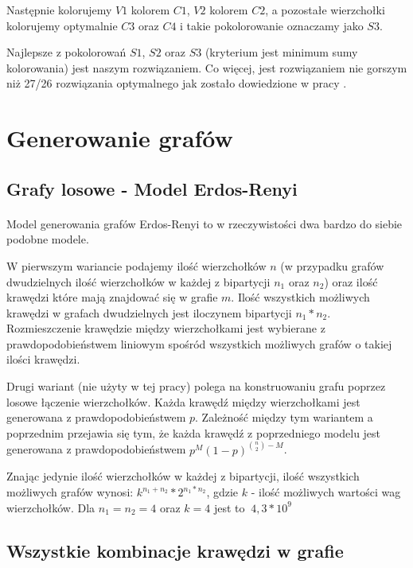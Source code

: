 \documentclass{article}
\begin{document}
Następnie kolorujemy $V1$ kolorem $C1$, $V2$ kolorem $C2$, a pozostałe wierzchołki kolorujemy optymalnie $C3$ oraz $C4$ i takie pokolorowanie oznaczamy jako $S3$.

Najlepsze z pokolorowań $S1$, $S2$ oraz $S3$ (kryterium jest minimum sumy kolorowania) jest naszym rozwiązaniem. Co więcej, jest rozwiązaniem nie gorszym niż 27/26 rozwiązania optymalnego jak zostało dowiedzione w pracy \cite{kubale-pikies19}.

\section{Generowanie grafów}

\subsection{Grafy losowe - Model Erdos-Renyi}

\paragraph{} Model generowania grafów Erdos-Renyi to w rzeczywistości dwa bardzo do siebie podobne modele. 

W pierwszym wariancie podajemy ilość wierzchołków $n$ (w przypadku grafów dwudzielnych ilość wierzchołków w każdej z bipartycji $n_1$ oraz $n_2$) oraz ilość krawędzi które mają znajdować się w grafie $m$. Ilość wszystkich możliwych krawędzi w grafach dwudzielnych jest iloczynem bipartycji $n_1 * n_2$. Rozmieszczenie krawędzie między wierzchołkami jest wybierane z prawdopodobieństwem liniowym spośród wszystkich możliwych grafów o takiej ilości krawędzi.

Drugi wariant (nie użyty w tej pracy) polega na konstruowaniu grafu poprzez losowe łączenie wierzchołków. Każda krawędź między wierzchołkami jest generowana z prawdopodobieństwem $p$. Zależność między tym wariantem a poprzednim przejawia się tym, że każda krawędź z poprzedniego modelu jest generowana z prawdopodobieństwem $p^M(1-p)^{{n \choose 2}-M}$.

Znając jedynie ilość wierzchołków w każdej z bipartycji, ilość wszystkich możliwych grafów wynosi: $k^{n_1+n_2}*2^{n_1*n_2}$, gdzie $k$ - ilość możliwych wartości wag wierzchołków. Dla $n_1=n_2=4$ oraz $k=4$ jest to $~4,3*10^9$

\subsection{Wszystkie kombinacje krawędzi w grafie}
\end{document}
